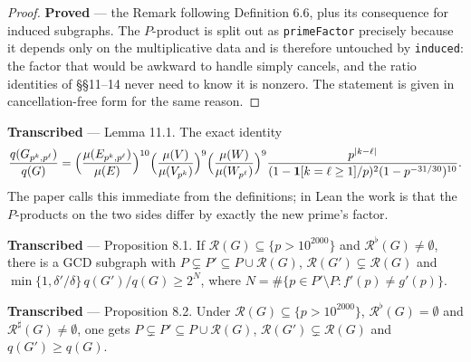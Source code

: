 \begin{proof}
  \leanok
  \textbf{Proved} --- the Remark following Definition 6.6, plus its consequence for
  induced subgraphs. The $P$-product is split out as \texttt{primeFactor} precisely
  because it depends only on the multiplicative data and is therefore untouched by
  \texttt{induced}: the factor that would be awkward to handle simply cancels, and the
  ratio identities of \S\S11--14 never need to know it is nonzero. The statement is given
  in cancellation-free form for the same reason.
\end{proof}

\begin{lemma}
  \label{lem:special-quality}
  \notready
  \textbf{Transcribed} --- Lemma 11.1. The exact identity
  \[ \frac{q(G_{p^k,p^\ell})}{q(G)}
     = \Bigl(\frac{\mu(E_{p^k,p^\ell})}{\mu(E)}\Bigr)^{10}
       \Bigl(\frac{\mu(V)}{\mu(V_{p^k})}\Bigr)^{9}
       \Bigl(\frac{\mu(W)}{\mu(W_{p^\ell})}\Bigr)^{9}
       \frac{p^{|k-\ell|}}{(1-\mathbf{1}[k=\ell\geq1]/p)^2(1-p^{-31/30})^{10}} . \]
  The paper calls this immediate from the definitions; in Lean the work is that the
  $P$-products on the two sides differ by exactly the new prime's factor.
\end{lemma}

\begin{proposition}
  \label{prop:iter1}
  \notready
  \textbf{Transcribed} --- Proposition 8.1. If $\mathcal{R}(G) \subseteq \{p > 10^{2000}\}$
  and $\mathcal{R}^\flat(G) \neq \emptyset$, there is a GCD subgraph with
  $P \subsetneq P' \subseteq P \cup \mathcal{R}(G)$,
  $\mathcal{R}(G') \subsetneq \mathcal{R}(G)$ and
  $\min\{1, \delta'/\delta\}\, q(G')/q(G) \geq 2^N$, where
  $N = \#\{p \in P'\setminus P : f'(p) \neq g'(p)\}$.
\end{proposition}

\begin{proposition}[Iteration when $\mathcal{R}^\flat(G) = \emptyset$]
  \label{prop:iter2}
  \notready
  \textbf{Transcribed} --- Proposition 8.2. Under
  $\mathcal{R}(G) \subseteq \{p > 10^{2000}\}$, $\mathcal{R}^\flat(G) = \emptyset$ and
  $\mathcal{R}^\sharp(G) \neq \emptyset$, one gets $P \subsetneq P' \subseteq P \cup
  \mathcal{R}(G)$, $\mathcal{R}(G') \subsetneq \mathcal{R}(G)$ and $q(G') \geq q(G)$.
\end{proposition}

